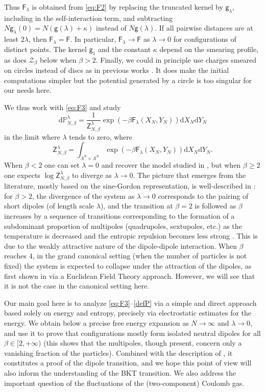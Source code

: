 \documentclass[a4paper,10pt,leqno]{amsart}
\numberwithin{equation}{section}
\newcommand{\dd}{\mathrm{d}}
\def\XN{X_N}
\def\YN{Y_N}
\def\Z{\mathsf{Z}_{N,\beta}^{\lambda}}
\def\P{\mathbb{P}_{N,\beta}^{\lambda}}
\def\g{\mathsf{g}}
\def\F{\mathsf{F}}
\begin{document}
Thus $\F_\lambda$ is obtained from \eqref{eq:F2} by replacing the truncated kernel by $\g_\lambda$, including in the self-interaction term, and subtracting $N\g_\lambda(0)=N(\g(\lambda)+\kappa)$ instead of $N\g(\lambda)$. If all pairwise distances are at least $2\lambda$, then $\F_\lambda=\F$. In particular, $\F_\lambda\to\F$ as $\lambda\to0$ for configurations of distinct points. The kernel $\g_1$ and the constant $\kappa$ depend on the smearing profile, as does $\mathcal Z_\beta$ below when $\beta>2$.
Finally, we could in principle use charges smeared on circles instead of discs as in previous works \cite{petrache2017next,LS1,LS2}. It does make the initial computations simpler but the potential generated by a circle is too singular for our needs here.
\smallskip

We thus work with \eqref{eq:F3} and study
\begin{equation} \label{defP}
  \dd\P= \frac{1}{\Z} \exp\left(- \beta \F_\lambda(\XN, \YN)\right) \dd X_N \dd Y_N
\end{equation}
in the limit where $\lambda$ tends to zero, where
\begin{equation*} \Z= \int_{\Lambda^{N}\times \Lambda^{N}} \exp\left(-\beta \F_\lambda(\XN, \YN)\right) \dd \XN \dd\YN.
\end{equation*}
When $\beta <2$ one can set $\lambda=0$ and recover the model studied in \cite{LSZ}, but when $\beta\ge2$ one expects $\log \Z$ to diverge as $\lambda \to 0$.
The picture that emerges from the literature, mostly based on the sine-Gordon representation,
is well-described in \cite{LRVboundary}:
for $\beta>2$, the divergence of the system as $\lambda\to 0$ corresponds to the pairing of short dipoles (of length scale $\lambda$), and the transition at $\beta=2$ is followed as $\beta$ increases by a sequence of transitions corresponding to the formation of a subdominant proportion of multipoles (quadrupoles, sextupoles, etc.) as the temperature is decreased and the entropic repulsion becomes less strong \cite{frohlichspencer}. This is due to the weakly attractive nature of the dipole-dipole interaction. When $\beta $ reaches $4$, in the grand canonical setting (when the number of particles is not fixed) the system is expected to collapse under the attraction of the dipoles, as first shown in \cite{Frohlich} via a Euclidean Field Theory approach. However, we will see that it is not the case in the canonical setting here.

Our main goal here is to analyze \eqref{eq:F3}--\eqref{defP} via a simple and direct approach based solely on energy and entropy, precisely via electrostatic estimates for the energy. We obtain below a precise free energy expansion as $N \to \infty$ and $\lambda \to 0$, and use it to prove that configurations mostly form isolated neutral dipoles for all $\beta \in [2,+\infty)$ (this shows that the multipoles, though present, concern only a vanishing fraction of the particles). Combined with the description of \cite{LSZ}, it constitutes a proof of the dipole transition, and we hope this point of view will also inform the understanding of the BKT transition. We also address the important question of the fluctuations of the (two-component) Coulomb gas.
\end{document}
